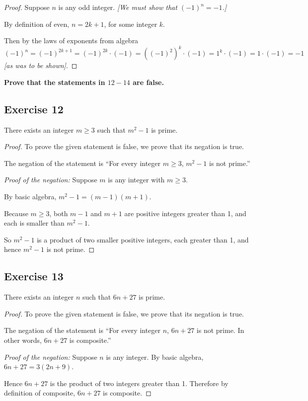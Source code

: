 \documentclass[14pt]{extarticle}
\newcommand{\cy}{\color{cyan}}
\begin{document}
\begin{proof}
Suppose $n$ is any odd integer. {\it [We must show that $(-1)^n = -1$.]}

By definition of even, $n = 2k+1$, for some integer $k$. 

Then by the laws of exponents from algebra 
\[
(-1)^n = (-1)^{2k+1} = (-1)^{2k}\cdot(-1) = ((-1)^2)^k\cdot(-1) = 1^k\cdot(-1) = 1\cdot(-1) = -1
\] 
{\it [as was to be shown]}.
\end{proof}

{\bf \cy Prove that the statements in $12-14$ are false.}

\subsection{Exercise 12}
There exists an integer $m \geq 3$ such that $m^2 - 1$ is prime.

\begin{proof}
To prove the given statement is false, we prove that its
negation is true.

The negation of the statement is “For every integer $m \geq 3$, $m^2 - 1$ is not prime.”

{\it Proof of the negation:} Suppose $m$ is any integer with $m \geq 3$. 

By basic algebra, $m^2 - 1 = (m - 1)(m + 1)$. 

Because $m \geq 3$, both $m - 1$ and $m + 1$ are positive integers greater than 1, and each is smaller than $m^2 - 1$. 

So $m^2 - 1$ is a product of two smaller positive integers, each greater than 1, and hence $m^2 - 1$ is not prime.
\end{proof}

\subsection{Exercise 13}
There exists an integer $n$ such that $6n + 27$ is prime.

\begin{proof}
To prove the given statement is false, we prove that its
negation is true.

The negation of the statement is “For every integer $n$, $6n+27$ is not prime. In other words, $6n+27$ is composite.”

{\it Proof of the negation:} Suppose $n$ is any integer. 
By basic algebra, $6n + 27 = 3(2n + 9)$. 

Hence $6n+27$ is the product of two integers greater than 1. Therefore by definition of composite, $6n+27$ is composite.
\end{proof}
\end{document}
